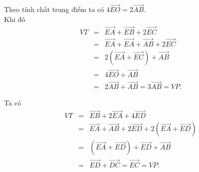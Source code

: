 \begin{bt}
{\begin{listEX}
			\item Theo tính chất trung điểm ta có $4\overrightarrow{EO} = 2\overrightarrow{AB}$.\\
			Khi đó
			{\allowdisplaybreaks
				\begin{eqnarray*}
					VT&=&\overrightarrow{EA} + \overrightarrow{EB} + 2\overrightarrow{EC} \\
					&=& \overrightarrow{EA} + \overrightarrow{EA} + \overrightarrow{AB} + 2\overrightarrow{EC}\\
					&=& 2\left(\overrightarrow{EA} + \overrightarrow{EC}\right) + \overrightarrow{AB} \\
					&=& 4\overrightarrow{EO} + \overrightarrow{AB} \\
					&=& 2\overrightarrow{AB} + \overrightarrow{AB} = 3\overrightarrow{AB} = VP.
			\end{eqnarray*}}
			\item Ta có
			{\allowdisplaybreaks
				\begin{eqnarray*}
					VT&=&\overrightarrow{EB} + 2\overrightarrow{EA} + 4\overrightarrow{ED} \\
					&=& \overrightarrow{EA} + \overrightarrow{AB} + 2\overrightarrow{ED} + 2\left(\overrightarrow{EA} + \overrightarrow{ED}\right)\\
					&=& \left(\overrightarrow{EA} + \overrightarrow{ED}\right) + \overrightarrow{ED} + \overrightarrow{AB} \\
					&=& \overrightarrow{ED} + \overrightarrow{DC} = \overrightarrow{EC} = VP.
			\end{eqnarray*}}
		\end{listEX}
	}
\end{bt}

